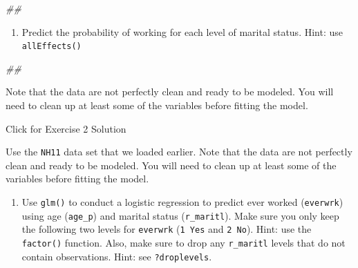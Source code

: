 \documentclass[
]{book}
\newenvironment{Shaded}{\begin{snugshade}}{\end{snugshade}}
\newcommand{\CommentTok}[1]{\textcolor[rgb]{0.56,0.35,0.01}{\textit{#1}}}
\providecommand{\tightlist}{%
  \setlength{\itemsep}{0pt}\setlength{\parskip}{0pt}}
\begin{document}
\begin{Shaded}
\begin{Highlighting}[]
\CommentTok{\#\# }
\end{Highlighting}
\end{Shaded}

\begin{enumerate}
\def\labelenumi{\arabic{enumi}.}
\setcounter{enumi}{1}
\tightlist
\item
  Predict the probability of working for each level of marital status. Hint: use \texttt{allEffects()}
\end{enumerate}

\begin{Shaded}
\begin{Highlighting}[]
\CommentTok{\#\# }
\end{Highlighting}
\end{Shaded}

Note that the data are not perfectly clean and ready to be modeled. You will need to clean up at least some of the variables before fitting the model.

{Click for Exercise 2 Solution}

Use the \texttt{NH11} data set that we loaded earlier. Note that the data are not perfectly clean and ready to be modeled. You will need to clean up at least some of the variables before fitting the model.

\begin{enumerate}
\def\labelenumi{\arabic{enumi}.}
\tightlist
\item
  Use \texttt{glm()} to conduct a logistic regression to predict ever worked (\texttt{everwrk}) using age (\texttt{age\_p}) and marital status (\texttt{r\_maritl}). Make sure you only keep the following two levels for \texttt{everwrk} (\texttt{1\ Yes} and \texttt{2\ No}). Hint: use the \texttt{factor()} function. Also, make sure to drop any \texttt{r\_maritl} levels that do not contain observations. Hint: see \texttt{?droplevels}.
\end{enumerate}
\end{document}
